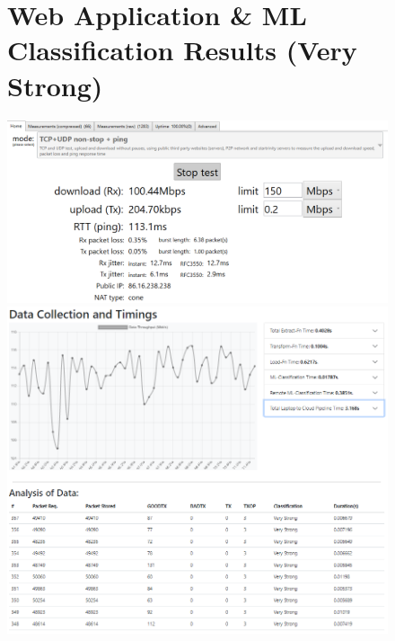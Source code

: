 \begin{figure}
\begin{minipage}{\linewidth}
\section{Web Application \& ML Classification Results (Very Strong) }
    \centering
    \includegraphics[width=1\linewidth]{images/100mbps.PNG}
    \includegraphics[width=1\linewidth]{images/veryStrong.PNG}
    \label{appendix:VeryStrongData}
\end{minipage}
\end{figure}

